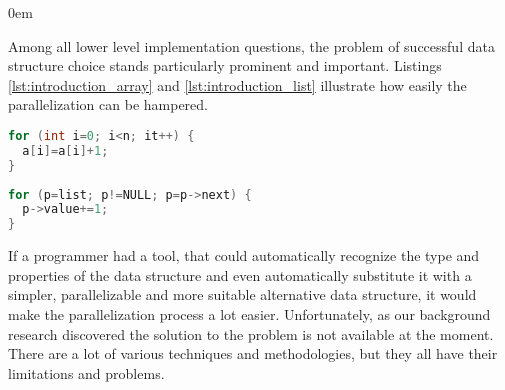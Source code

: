 \begin{description}[style=unboxed,leftmargin=0cm]
\itemsep0em
\item[Data-centric parallelization problem] Among all lower level implementation questions, the problem of successful data structure choice stands particularly prominent and important. Listings \ref{lst:introduction_array} and \ref{lst:introduction_list} illustrate how easily the parallelization can be hampered.
\begin{minipage}[t]{0.45\linewidth}
\begin{lstlisting}[caption={Parallelisable loop operating on a \textbf{linear array}.},label={lst:introduction_array},language=C]
for (int i=0; i<n; it++) {
  a[i]=a[i]+1;
}
\end{lstlisting}
\end{minipage}
%
\begin{minipage}[t]{0.5\linewidth}
\begin{lstlisting}[caption={Non-parallelisable loop operating on a \textbf{linked-list}.},label={lst:introduction_list},language=C]
for (p=list; p!=NULL; p=p->next) {
  p->value+=1;
}
\end{lstlisting}
\end{minipage}
If a programmer had a tool, that could automatically recognize the type and properties of the data structure and even automatically substitute it with a simpler, parallelizable and more suitable alternative data structure, it would make the parallelization process a lot easier. Unfortunately, as our background research discovered the solution to the problem is not available at the moment. There are a lot of various techniques and methodologies, but they all have their limitations and problems.

\end{description}
